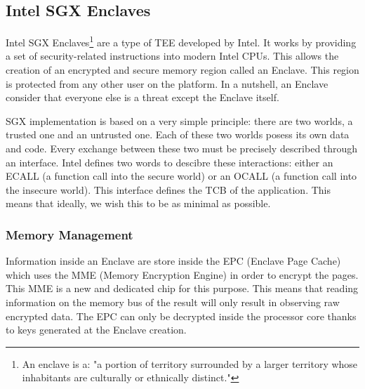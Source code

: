 \documentclass[../main.tex]{subfiles}
\begin{document}
\subsection{Intel SGX Enclaves}
\label{section:theoric:intel_sgx}
\par Intel SGX Enclaves\footnote{An enclave is a: "a portion of territory surrounded by a larger territory whose inhabitants are culturally or ethnically distinct."} are a type of TEE developed by Intel. It works by providing a set of security-related instructions into modern Intel CPUs. This allows the creation of an encrypted and secure memory region called an Enclave. This region is protected from any other user on the platform. In a nutshell, an Enclave consider that everyone else is a threat except the Enclave itself.
\par SGX implementation is based on a very simple principle: there are two worlds, a trusted one and an untrusted one.  Each of these two worlds posess its own data and code. Every exchange between these two must be precisely described through an interface. Intel defines two words to descibre these interactions: either an ECALL (a function call into the secure world) or an OCALL (a function call into the insecure world). This interface defines the TCB of the application. This means that ideally, we wish this to be as minimal as possible.

\subsubsection{Memory Management}
\label{section:theoric:memory_management}
\par Information inside an Enclave are store inside the EPC (Enclave Page Cache) which uses the MME (Memory Encryption Engine) in order to encrypt the pages. This MME is a new and dedicated chip for this purpose. This means that reading information on the memory bus of the result will only result in observing raw encrypted data. The EPC can only be decrypted inside the processor core thanks to keys generated at the Enclave creation.
\end{document}

